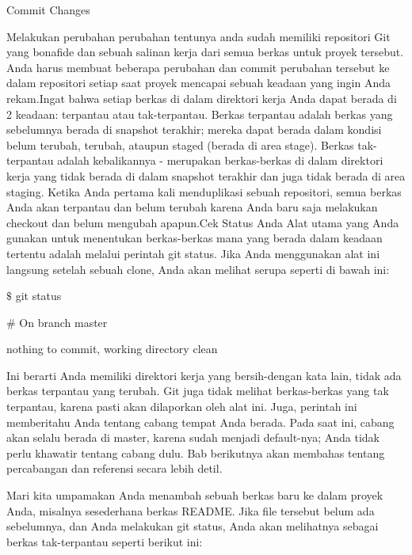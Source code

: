 
\sloppy
\begin{center}{\fontsize{18pt}{18pt}\selectfont Commit Changes \\}\end{center} \par
Melakukan perubahan perubahan tentunya anda sudah memiliki repositori Git yang bonafide dan sebuah salinan kerja dari semua berkas untuk proyek tersebut. Anda harus membuat beberapa perubahan dan commit perubahan tersebut ke dalam repositori setiap saat proyek mencapai sebuah keadaan yang ingin Anda rekam.Ingat bahwa setiap berkas di dalam direktori kerja Anda dapat berada di 2 keadaan: terpantau atau tak-terpantau. Berkas terpantau adalah berkas yang sebelumnya berada di snapshot terakhir; mereka dapat berada dalam kondisi belum terubah, terubah, ataupun staged (berada di area stage). Berkas tak-terpantau adalah kebalikannya - merupakan berkas-berkas di dalam direktori kerja yang tidak berada di dalam snapshot terakhir dan juga tidak berada di area staging. Ketika Anda pertama kali menduplikasi sebuah repositori, semua berkas Anda akan terpantau dan belum terubah karena Anda baru saja melakukan checkout dan belum mengubah apapun.Cek Status Anda Alat utama yang Anda gunakan untuk menentukan berkas-berkas mana yang berada dalam keadaan tertentu adalah melalui perintah git status. Jika Anda menggunakan alat ini langsung setelah sebuah clone, Anda akan melihat serupa seperti di bawah ini: \par
\noindent 
 $  \$  $ git status \par
\noindent 
 $  \#  $ On branch master \par
\noindent 
nothing to commit, working directory clean \par
\noindent 
Ini berarti Anda memiliki direktori kerja yang bersih-dengan kata lain, tidak ada berkas terpantau yang terubah. Git juga tidak melihat berkas-berkas yang tak terpantau, karena pasti akan dilaporkan oleh alat ini. Juga, perintah ini memberitahu Anda tentang cabang tempat Anda berada. Pada saat ini, cabang akan selalu berada di master, karena sudah menjadi default-nya; Anda tidak perlu khawatir tentang cabang dulu. Bab berikutnya akan membahas tentang percabangan dan referensi secara lebih detil. \par
\noindent 
Mari kita umpamakan Anda menambah sebuah berkas baru ke dalam proyek Anda, misalnya sesederhana berkas README. Jika file tersebut belum ada sebelumnya, dan Anda melakukan git status, Anda akan melihatnya sebagai berkas tak-terpantau seperti berikut ini: \par
